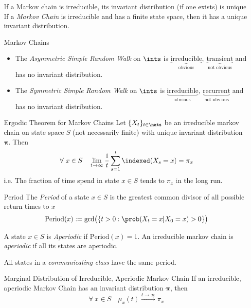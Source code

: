 \documentclass[11pt,a4paper]{article}
\begin{document}
\begin{remark}{If a Markov chain is irreducible, its invariant distribution (if one exists) is unique}
  If a \textit{Markov Chain} is irreducible and has a finite state space, then it has a unique invariant distribution.
\end{remark}

\begin{example}{Markov Chains}
  \begin{itemize}
    \item The \textit{Asymmetric Simple Random Walk} on $\ints$ is $\underbrace{\text{irreducible}}_\text{obvious},\ \underbrace{\text{transient}}_\text{not obvious}$ and has no invariant distribution.
    \item The \textit{Symmetric Simple Random Walk} on $\ints$ is $\underbrace{\text{irreducible}}_\text{obvious},\ \underbrace{\text{recurrent}}_\text{not obvious}$ and has no invariant distribution.
  \end{itemize}
\end{example}

\begin{theorem}{Ergodic Theorem for Markov Chains}
  Let $\{X_t\}_{t\in\nats}$ be an irreducible markov chain on state space $S$ (not necessarily finite) with unique invariant distribution $\pmb\pi$. Then
  \[ \forall\ x\in S\quad\lim_{t\to\infty}\frac1t\sum_{s=1}^t \indexed(X_s=x)=\pi_x\]
  i.e. The fraction of time spend in state $x\in S$ tends to $\pi_x$ in the long run.
\end{theorem}

\begin{definition}{Period}
  The \textit{Period} of a state $x\in S$ is the greatest common divisor of all possible return times to $x$
  \[ \text{Period}(x):=\text{gcd}\big(\{t>0:\prob(X_t=x|X_0=x)>0\}\big) \]
  \par A state $x\in S$ is \textit{Aperiodic} if $\text{Period}(x)=1$. An irreducible markov chain is \textit{aperiodic} if all its states are aperiodic.
  \par All states in a \textit{communicating class} have the same period.
\end{definition}

\begin{proposition}{Marginal Distribution of Irreducible, Aperiodic Markov Chain}
  If an irreducible, aperiodic Markov Chain has an invariant distribution $\pmb\pi$, then
  \[ \forall\ x\in S\quad\mu_x(t)\overset{t\to\infty}{\longrightarrow}\pi_x \]
\end{proposition}
\end{document}
